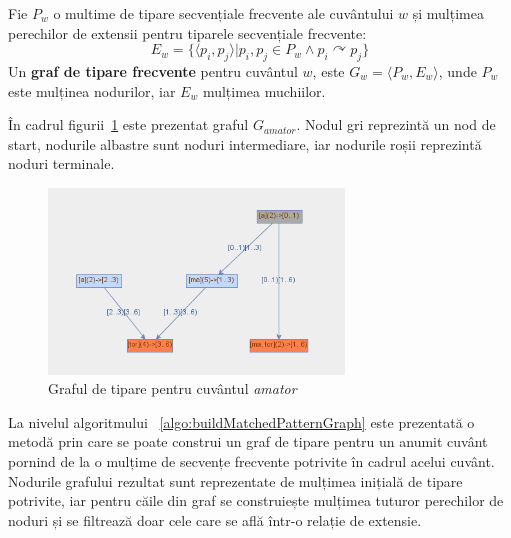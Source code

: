 \begin{defi}
Fie $P_w$ o multime de tipare secvențiale frecvente ale cuvântului $w$ și mulțimea perechilor de extensii pentru tiparele secvențiale frecvente: 
\begin{equation}
E_w = \{\langle p_i, p_j \rangle \vert p_i,p_j \in P_w \wedge p_i \curvearrowright p_j\}
\end{equation}
Un \textbf{graf de tipare frecvente} pentru cuvântul $w$, este $G_w = \langle P_w, E_w \rangle$, unde $P_w$ este mulținea nodurilor, iar $E_w$ mulțimea muchiilor. 
\end{defi}

\begin{ex}
În cadrul figurii~\ref{fig:rosil-amator} este prezentat graful $G_{amator}$. Nodul gri reprezintă un nod de start, nodurile albastre sunt noduri intermediare, iar nodurile roșii reprezintă noduri terminale. 
\end{ex}

\begin{figure}[h!]
    \centering
    \includegraphics[width=0.7\textwidth]{figures/rosil-amator.png}
    \caption{Graful de tipare pentru cuvântul \textit{amator}}
    \label{fig:rosil-amator}
\end{figure}

La nivelul algoritmului ~\ref{algo:buildMatchedPatternGraph} este prezentată o metodă prin care se poate construi un graf de tipare pentru un anumit cuvânt pornind de la o mulțime de secvențe frecvente potrivite în cadrul acelui cuvânt. Nodurile grafului rezultat sunt reprezentate de mulțimea inițială de tipare potrivite, iar pentru căile din graf se construiește mulțimea tuturor perechilor de noduri și se filtrează doar cele care se află într-o relație de extensie.

